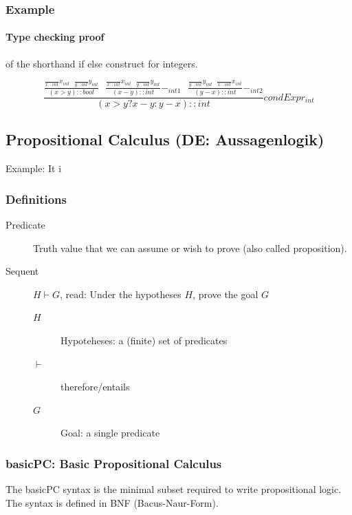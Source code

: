 \subsubsection{Example}

\paragraph{Type checking proof}

of the shorthand if else construct for integers.

\[
	\frac{
			\frac{
				\frac{}{x::int}x_{int} \text{   } \frac{}{y::int}y_{int}
			}{(x > y)::bool} \text{   }
		  \frac{
				\frac{}{x::int}x_{int} \text{   } \frac{}{y::int}y_{int}
			}{(x - y)::int} -_{int1} \text{   }
			\frac{
				\frac{}{y::int}y_{int} \text{   } \frac{}{x::int}x_{int}
			}{(y - x)::int} -_{int2}
		}{(x>y? x - y : y - x)::int} condExpr_{int}
\]

\subsection{Propositional Calculus (DE: Aussagenlogik)}

Example:
It i

\subsubsection{Definitions}
\begin{description}
	\item[Predicate] Truth value that we can assume or wish to prove (also called proposition).
	\item[Sequent] $H \vdash G$, read: Under the hypotheses $H$, prove the goal $G$ \hfill \\
	\begin{description}
		\item[$H$] Hypoteheses: a (finite) set of predicates
		\item[$\vdash$] therefore/entails
		\item[$G$] Goal: a single predicate
	\end{description}
\end{description}

\subsubsection{basicPC: Basic Propositional Calculus}

The basicPC syntax is the minimal subset required to write propositional logic. The syntax is defined in BNF (Bacus-Naur-Form).

